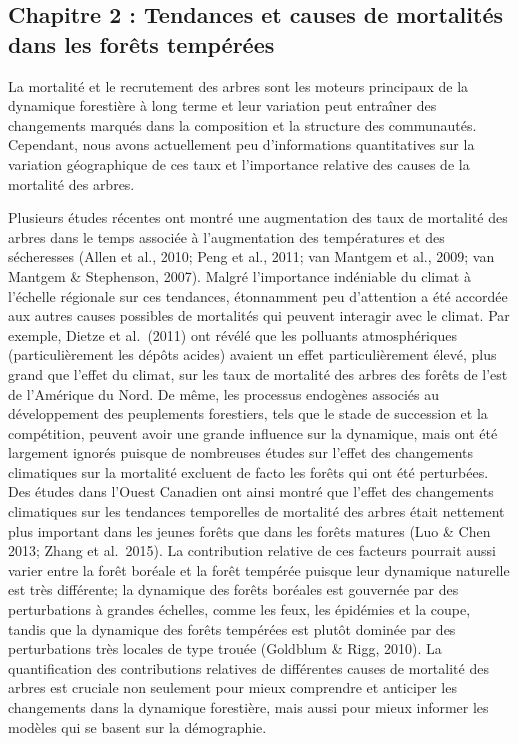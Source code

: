 \documentclass[
]{article}
\begin{document}
\hypertarget{chapitre-2-tendances-et-causes-de-mortalituxe9s-dans-les-foruxeats-tempuxe9ruxe9es}{%
\subsection{Chapitre 2 : Tendances et causes de mortalités dans les
forêts
tempérées}\label{chapitre-2-tendances-et-causes-de-mortalituxe9s-dans-les-foruxeats-tempuxe9ruxe9es}}

La mortalité et le recrutement des arbres sont les moteurs principaux de
la dynamique forestière à long terme et leur variation peut entraîner
des changements marqués dans la composition et la structure des
communautés. Cependant, nous avons actuellement peu d'informations
quantitatives sur la variation géographique de ces taux et l'importance
relative des causes de la mortalité des arbres.

Plusieurs études récentes ont montré une augmentation des taux de
mortalité des arbres dans le temps associée à l'augmentation des
températures et des sécheresses (Allen et al., 2010; Peng et al., 2011;
van Mantgem et al., 2009; van Mantgem \& Stephenson, 2007). Malgré
l'importance indéniable du climat à l'échelle régionale sur ces
tendances, étonnamment peu d'attention a été accordée aux autres causes
possibles de mortalités qui peuvent interagir avec le climat. Par
exemple, Dietze et al.~(2011) ont révélé que les polluants
atmosphériques (particulièrement les dépôts acides) avaient un effet
particulièrement élevé, plus grand que l'effet du climat, sur les taux
de mortalité des arbres des forêts de l'est de l'Amérique du Nord. De
même, les processus endogènes associés au développement des peuplements
forestiers, tels que le stade de succession et la compétition, peuvent
avoir une grande influence sur la dynamique, mais ont été largement
ignorés puisque de nombreuses études sur l'effet des changements
climatiques sur la mortalité excluent de facto les forêts qui ont été
perturbées. Des études dans l'Ouest Canadien ont ainsi montré que
l'effet des changements climatiques sur les tendances temporelles de
mortalité des arbres était nettement plus important dans les jeunes
forêts que dans les forêts matures (Luo \& Chen 2013; Zhang et
al.~2015). La contribution relative de ces facteurs pourrait aussi
varier entre la forêt boréale et la forêt tempérée puisque leur
dynamique naturelle est très différente; la dynamique des forêts
boréales est gouvernée par des perturbations à grandes échelles, comme
les feux, les épidémies et la coupe, tandis que la dynamique des forêts
tempérées est plutôt dominée par des perturbations très locales de type
trouée (Goldblum \& Rigg, 2010). La quantification des contributions
relatives de différentes causes de mortalité des arbres est cruciale non
seulement pour mieux comprendre et anticiper les changements dans la
dynamique forestière, mais aussi pour mieux informer les modèles qui se
basent sur la démographie.
\end{document}

